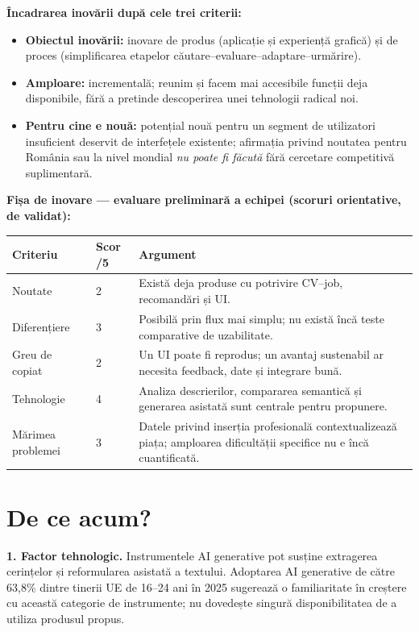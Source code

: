 \documentclass[12pt,a4paper]{article}
\begin{document}
\textbf{Încadrarea inovării după cele trei criterii:}
\begin{itemize}[leftmargin=*,itemsep=0.1em]
\item \textbf{Obiectul inovării:} inovare de produs (aplicație și experiență grafică) și de proces (simplificarea etapelor căutare--evaluare--adaptare--urmărire).
\item \textbf{Amploare:} incrementală; reunim și facem mai accesibile funcții deja disponibile, fără a pretinde descoperirea unei tehnologii radical noi.
\item \textbf{Pentru cine e nouă:} potențial nouă pentru un segment de utilizatori insuficient deservit de interfețele existente; afirmația privind noutatea pentru România sau la nivel mondial \emph{nu poate fi făcută} fără cercetare competitivă suplimentară.
\end{itemize}

\textbf{Fișa de inovare --- evaluare preliminară a echipei (scoruri orientative, de validat):}
\par\medskip
\begin{tabularx}{\textwidth}{p{2.6cm}p{1.15cm}X}
\toprule Criteriu & Scor /5 & Argument\\\midrule
Noutate & 2 & Există deja produse cu potrivire CV--job, recomandări și UI.\\
Diferențiere & 3 & Posibilă prin flux mai simplu; nu există încă teste comparative de uzabilitate.\\
Greu de copiat & 2 & Un UI poate fi reprodus; un avantaj sustenabil ar necesita feedback, date și integrare bună.\\
Tehnologie & 4 & Analiza descrierilor, compararea semantică și generarea asistată sunt centrale pentru propunere.\\
Mărimea problemei & 3 & Datele privind inserția profesională contextualizează piața; amploarea dificultății specifice nu e încă cuantificată.\\
\bottomrule
\end{tabularx}

\section{De ce acum?}
\textbf{1. Factor tehnologic.} Instrumentele AI generative pot susține extragerea cerințelor și reformularea asistată a textului. Adoptarea AI generative de către 63,8\% dintre tinerii UE de 16--24 ani în 2025 sugerează o familiaritate în creștere cu această categorie de instrumente; nu dovedește singură disponibilitatea de a utiliza produsul propus.
\end{document}
